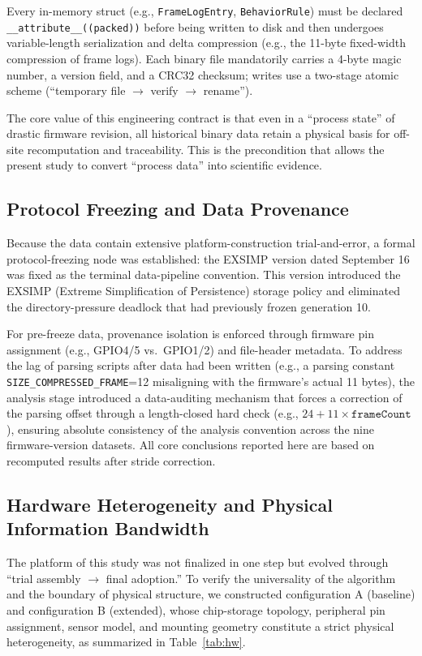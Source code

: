 \documentclass[11pt]{article}
\begin{document}
Every in-memory struct (e.g., \texttt{FrameLogEntry}, \texttt{BehaviorRule}) must be declared \verb|__attribute__((packed))| before being written to disk and then undergoes variable-length serialization and delta compression (e.g., the 11-byte fixed-width compression of frame logs). Each binary file mandatorily carries a 4-byte magic number, a version field, and a CRC32 checksum; writes use a two-stage atomic scheme (``temporary file $\rightarrow$ verify $\rightarrow$ rename'').

The core value of this engineering contract is that even in a ``process state'' of drastic firmware revision, all historical binary data retain a physical basis for off-site recomputation and traceability. This is the precondition that allows the present study to convert ``process data'' into scientific evidence.

\subsection{Protocol Freezing and Data Provenance}
Because the data contain extensive platform-construction trial-and-error, a formal protocol-freezing node was established: the EXSIMP version dated September 16 was fixed as the terminal data-pipeline convention. This version introduced the EXSIMP (Extreme Simplification of Persistence) storage policy and eliminated the directory-pressure deadlock that had previously frozen generation 10.

For pre-freeze data, provenance isolation is enforced through firmware pin assignment (e.g., GPIO4/5 vs.\ GPIO1/2) and file-header metadata. To address the lag of parsing scripts after data had been written (e.g., a parsing constant \texttt{SIZE\_COMPRESSED\_FRAME}=12 misaligning with the firmware's actual 11 bytes), the analysis stage introduced a data-auditing mechanism that forces a correction of the parsing offset through a length-closed hard check (e.g., $24 + 11 \times \texttt{frameCount}$), ensuring absolute consistency of the analysis convention across the nine firmware-version datasets. All core conclusions reported here are based on recomputed results after stride correction.

\subsection{Hardware Heterogeneity and Physical Information Bandwidth}
The platform of this study was not finalized in one step but evolved through ``trial assembly $\rightarrow$ final adoption.'' To verify the universality of the algorithm and the boundary of physical structure, we constructed configuration A (baseline) and configuration B (extended), whose chip-storage topology, peripheral pin assignment, sensor model, and mounting geometry constitute a strict physical heterogeneity, as summarized in Table~\ref{tab:hw}.
\end{document}
